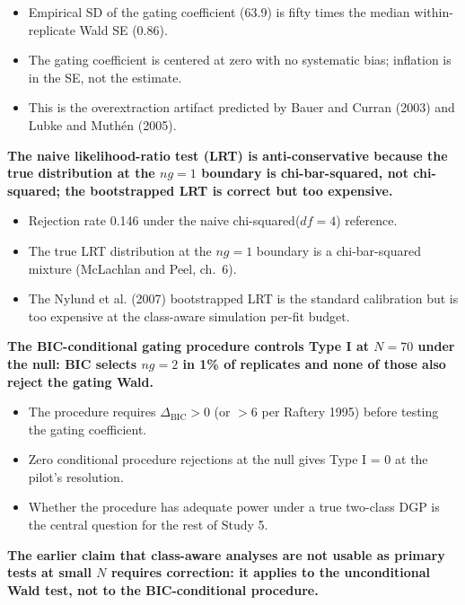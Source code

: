 \documentclass[
  11pt,
]{article}
\newcounter{none} %
\begin{document}
\begin{itemize}\setlength{\itemsep}{2pt}\setlength{\parskip}{0pt}
\item Empirical SD of the gating coefficient (63.9) is fifty times
  the median within-replicate Wald SE (0.86).
\item The gating coefficient is centered at zero with no systematic
  bias; inflation is in the SE, not the estimate.
\item This is the overextraction artifact predicted by Bauer and Curran (2003)
  and Lubke and Muthén (2005).
\end{itemize}

\textbf{The naive likelihood-ratio test (LRT) is anti-conservative
because the true
distribution at the $ng=1$ boundary is chi-bar-squared, not
chi-squared; the bootstrapped LRT is correct but too expensive.}

\begin{itemize}\setlength{\itemsep}{2pt}\setlength{\parskip}{0pt}
\item Rejection rate 0.146 under the naive chi-squared($df=4$)
  reference.
\item The true LRT distribution at the $ng=1$ boundary is a
  chi-bar-squared mixture (McLachlan and Peel, ch.\ 6).
\item The Nylund et al. (2007) bootstrapped LRT is the standard calibration
  but is too expensive at the class-aware simulation per-fit budget.
\end{itemize}

\textbf{The BIC-conditional gating procedure controls Type I at
$N = 70$ under the null: BIC selects $ng=2$ in 1\% of replicates and
none of those also reject the gating Wald.}

\begin{itemize}\setlength{\itemsep}{2pt}\setlength{\parskip}{0pt}
\item The procedure requires $\Delta_{\text{BIC}} > 0$ (or
  $> 6$ per Raftery 1995) before testing the gating coefficient.
\item Zero conditional procedure rejections at the null gives Type I
  = 0 at the pilot's resolution.
\item Whether the procedure has adequate power under a true two-class
  DGP is the central question for the rest of Study 5.
\end{itemize}

\textbf{The earlier claim that class-aware analyses are not usable as
primary tests at small $N$ requires correction: it applies to the
unconditional Wald test, not to the BIC-conditional procedure.}
\end{document}
